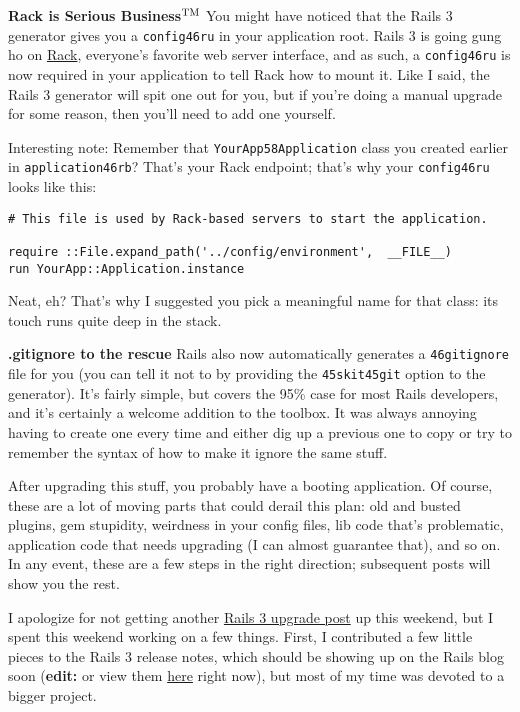 \documentclass{book}
\begin{document}
\textbf{Rack is Serious Business$^{\rm TM}${}} You might have noticed that the Rails 3 generator gives you a {\colorbox[rgb]{0.87,0.87,0.87}{\tt config\char46ru}} in your application root. Rails 3 is going gung ho on \href{http://rack.rubyforge.org/}{Rack}, everyone'{}s favorite web server interface, and as such, a {\colorbox[rgb]{0.87,0.87,0.87}{\tt config\char46ru}} is now required in your application to tell Rack how to mount it. Like I said, the Rails 3 generator will spit one out for you, but if you'{}re doing a manual upgrade for some reason, then you'{}ll need to add one yourself.

Interesting note: Remember that {\colorbox[rgb]{0.87,0.87,0.87}{\tt YourApp\char58Application}} class you created earlier in {\colorbox[rgb]{0.87,0.87,0.87}{\tt application\char46rb}}? That'{}s your Rack endpoint; that'{}s why your {\colorbox[rgb]{0.87,0.87,0.87}{\tt config\char46ru}} looks like this:

\begin{verbatim}# This file is used by Rack-based servers to start the application.

require ::File.expand_path('../config/environment',  __FILE__)
run YourApp::Application.instance\end{verbatim}
Neat, eh? That'{}s why I suggested you pick a meaningful name for that class: its touch runs quite deep in the stack.

\textbf{.gitignore to the rescue} Rails also now automatically generates a {\colorbox[rgb]{0.87,0.87,0.87}{\tt \char46gitignore}} file for you (you can tell it not to by providing the {\colorbox[rgb]{0.87,0.87,0.87}{\tt {}\char45skit\char45git}} option to the generator). It'{}s fairly simple, but covers the 95\% case for most Rails developers, and it'{}s certainly a welcome addition to the toolbox. It was always annoying having to create one every time and either dig up a previous one to copy or try to remember the syntax of how to make it ignore the same stuff.

After upgrading this stuff, you probably have a booting application. Of course, these are a lot of moving parts that could derail this plan: old and busted plugins, gem stupidity, weirdness in your config files, lib code that'{}s problematic, application code that needs upgrading (I can almost guarantee that), and so on. In any event, these are a few steps in the right direction; subsequent posts will show you the rest.

I apologize for not getting another \href{http://omgbloglol.com/post/344792822/the-path-to-rails-3-introduction}{Rails 3 upgrade post} up this weekend, but I spent this weekend working on a few things. First, I contributed a few little pieces to the Rails 3 release notes, which should be showing up on the Rails blog soon (\textbf{edit:} or view them \href{http://guides.rails.info/3_0_release_notes.html}{here} right now), but most of my time was devoted to a bigger project.
\end{document}
